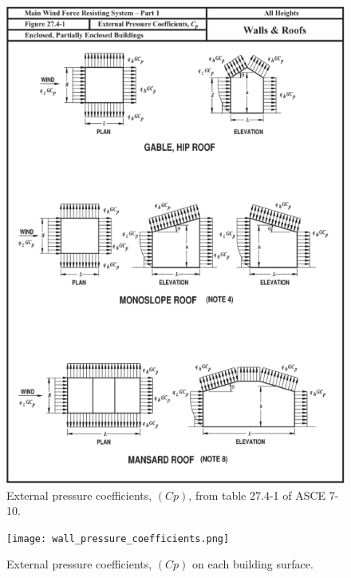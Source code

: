 \documentclass[a4paper,11pt]{xc_memo}
\begin{document}
\begin{figure}
  \begin{center}
  \includegraphics[width= 120mm]{figure_27_4_1.png}
  \end{center}
  \caption{External pressure coefficients, $(Cp)$, from table 27.4-1 of ASCE 7-10.}
\end{figure}

\begin{figure}
  \begin{center}
  \texttt{[image: wall\_pressure\_coefficients.png]}
  \end{center}
  \caption{External pressure coefficients, $(Cp)$ on each building surface.}
\end{figure}
\end{document}
